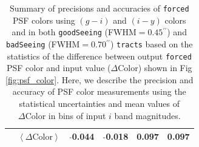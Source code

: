 \documentclass[useamsfonts]{pasj01}
\def\asec{$^{\prime\prime}$}
\def\forced{\texttt{forced}}
\def\tracts{\texttt{tracts}}
\newcommand{\minus}{\raisebox{.4\height}{\scalebox{.8}{-}}}
\newcommand{\mcolor}{$\left<{\Delta\mathrm{Color}}\right>$}
\newcommand{\n}{$\minus$}
\begin{document}
\begin{table}
\begin{center}
\begin{tabular}{| c | c | c | c | c | c | }
    \rowcolor[gray]{.85}      & \mcolor{} & \n0.044 & \n0.018 &   0.097 &   0.097 \\
    \hline
    \end{tabular}
    \end{center}
    \caption{
        Summary of precisions and accuracies of \forced{} PSF colors using $(g-i)$ and 
        $(i-y)$ colors and in both \texttt{goodSeeing} (FWHM$=0.45$\asec{}) and
        \texttt{badSeeing} (FWHM$=0.70$\asec{}) \tracts{} based on the statistics of 
        the difference between output \forced{} PSF color and input value 
        ($\Delta\mathrm{Color}$) shown in Fig \ref{fig:psf_color}.
        Here, we describe the precision and accuracy of PSF color measurements using 
        the statistical uncertainties and mean values of $\Delta\mathrm{Color}$ in 
        bins of input $i$ band magnitudes.
    }
        \label{tab:psfcolor}
\end{table}
\end{document}
